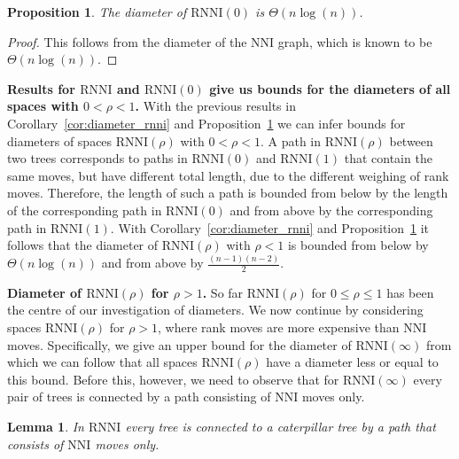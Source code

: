 \documentclass[11pt]{amsart}
\newtheorem{proposition}{Proposition}
\newtheorem{lemma}{Lemma}
\newcommand{\rnni}{\mathrm{RNNI}}
\newcommand{\nni}{\mathrm{NNI}}
\newcommand{\summary}[1]{\textbf{#1}} %
\begin{document}
\begin{proposition}
	The diameter of $\rnni(0)$ is $\Theta(n \log(n))$.
	\label{prop:diameter_nni}
\end{proposition}

\begin{proof}
	This follows from the diameter of the $\nni$ graph, which is known \autocite{Semple2003-nj} to be $\Theta(n \log(n))$.
\end{proof}

\summary{Results for $\rnni$ and $\rnni(0)$ give us bounds for the diameters of all spaces with $0 < \rho < 1$.}
With the previous results in Corollary~\ref{cor:diameter_rnni} and Proposition~\ref{prop:diameter_nni} we can infer bounds for diameters of spaces $\rnni(\rho)$ with $0 < \rho < 1$.
A path in $\rnni(\rho)$ between two trees corresponds to paths in $\rnni(0)$ and $\rnni(1)$ that contain the same moves, but have different total length, due to the different weighing of rank moves.
Therefore, the length of such a path is bounded from below by the length of the corresponding path in $\rnni(0)$ and from above by the corresponding path in $\rnni(1)$.
With Corollary~\ref{cor:diameter_rnni} and Proposition~\ref{prop:diameter_nni} it follows that the diameter of $\rnni(\rho)$ with $\rho < 1$ is bounded from below by $\Theta(n \log(n))$ and from above by $\frac{(n-1)(n-2)}{2}$.

\summary{Diameter of $\rnni(\rho)$ for $\rho > 1$.}
So far $\rnni(\rho)$ for $0 \leq \rho \leq 1$ has been the centre of our investigation of diameters.
We now continue by considering spaces $\rnni(\rho)$ for $\rho > 1$, where rank moves are more expensive than $\nni$ moves.
Specifically, we give an upper bound for the diameter of $\rnni(\infty)$ from which we can follow that all spaces $\rnni(\rho)$ have a diameter less or equal to this bound.
Before this, however, we need to observe that for $\rnni(\infty)$ every pair of trees is connected by a path consisting of $\nni$ moves only.

\begin{lemma}
	In $\rnni$ every tree is connected to a caterpillar tree by a path that consists of $\nni$ moves only.
	\label{lemma:nni_path_to_caterpillar}
\end{lemma}
\end{document}
